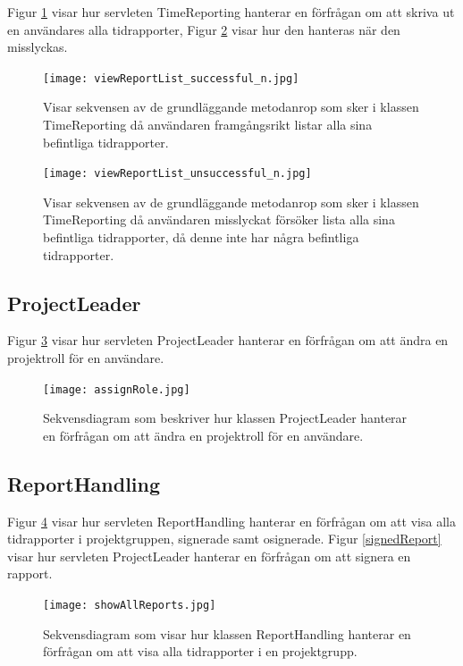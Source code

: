 \documentclass[a4paper]{article}
\begin{document}
\noindent
Figur \ref{viewReportList} visar hur servleten TimeReporting hanterar en förfrågan om att skriva ut en användares alla tidrapporter, Figur \ref{viewReportListFail} visar hur den hanteras när den misslyckas.

\begin{figure}[h!]
\centering
\texttt{[image: viewReportList\_successful\_n.jpg]}
\caption{Visar sekvensen av de grundläggande metodanrop som sker i klassen TimeReporting då användaren framgångsrikt listar alla sina befintliga tidrapporter.
\label{viewReportList}}
\end{figure}

\begin{figure}[h!]
\centering
\texttt{[image: viewReportList\_unsuccessful\_n.jpg]}
\caption{Visar sekvensen av de grundläggande metodanrop som sker i klassen TimeReporting då användaren misslyckat försöker lista alla sina befintliga tidrapporter, då denne inte har några befintliga tidrapporter.
\label{viewReportListFail}}
\end{figure}


\subsection{ProjectLeader}
Figur \ref{assignRole} visar hur servleten ProjectLeader hanterar en förfrågan om att ändra en projektroll för en användare.

\begin{figure}[h!]
\centering
\texttt{[image: assignRole.jpg]}
\caption{Sekvensdiagram som beskriver hur klassen ProjectLeader hanterar en förfrågan om att ändra en projektroll för en användare.
\label{assignRole}}
\end{figure}

\subsection{ReportHandling}

Figur \ref{showAllReports} visar hur servleten ReportHandling hanterar en förfrågan om att visa alla tidrapporter i projektgruppen, signerade samt osignerade. Figur \ref{signedReport} visar hur servleten ProjectLeader hanterar en förfrågan om att signera en rapport.

\begin{figure}[h!]
\centering
\texttt{[image: showAllReports.jpg]}
\caption{Sekvensdiagram som visar hur klassen ReportHandling hanterar en förfrågan om att visa alla tidrapporter i en projektgrupp.
\label{showAllReports}}
\end{figure}
\end{document}
